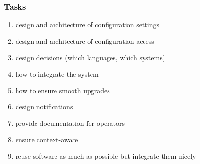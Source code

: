 \begin{frame}
	\frametitle{Tasks}

	\begin{enumerate}
	\item design and architecture of configuration settings
	\item design and architecture of configuration access
	\item design decisions (which languages, which systems)
	\item how to integrate the system
	\item how to ensure smooth upgrades
	\item design notifications
	\item provide documentation for operators
	\item ensure context-aware
	\item reuse software as much as possible but integrate them nicely
	\end{enumerate}
\end{frame}





\nocite{raab2017introducing}

\appendix

\begin{frame}[allowframebreaks]
	
	
\end{frame}




